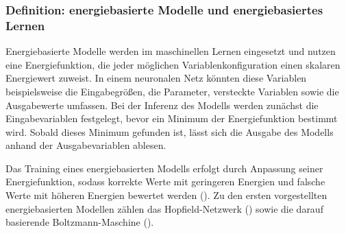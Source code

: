 \subsubsection{Definition: energiebasierte Modelle und energiebasiertes Lernen}

Energiebasierte Modelle werden im maschinellen Lernen eingesetzt und nutzen eine Energiefunktion, die jeder möglichen Variablenkonfiguration einen skalaren Energiewert zuweist. In einem neuronalen Netz könnten diese Variablen beispielsweise die Eingabegrößen, die Parameter, versteckte Variablen sowie die Ausgabewerte umfassen. Bei der Inferenz des Modells werden zunächst die Eingabevariablen festgelegt, bevor ein Minimum der Energiefunktion bestimmt wird. Sobald dieses Minimum gefunden ist, lässt sich die Ausgabe des Modells anhand der Ausgabevariablen ablesen.

Das Training eines energiebasierten Modells erfolgt durch Anpassung seiner Energiefunktion, sodass korrekte Werte mit geringeren Energien und falsche Werte mit höheren Energien bewertet werden (\cite{Lecun2006}). Zu den ersten vorgestellten energiebasierten Modellen zählen das Hopfield-Netzwerk (\cite{Hopfield1984}) sowie die darauf basierende Boltzmann-Maschine (\cite{Ackley1985}).
